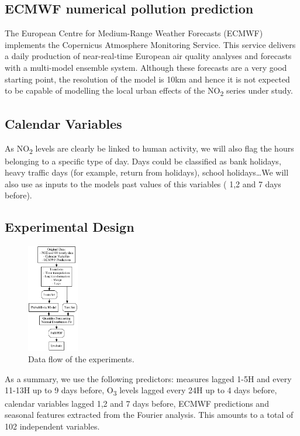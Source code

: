 \documentclass[a4paper,3p,sort&compress]{elsarticle}
\begin{document}
\subsection{ECMWF numerical pollution prediction}
\label{sec:ecmwf-numer-poll}

The European Centre for Medium-Range Weather Forecasts (ECMWF)
implements the Copernicus Atmosphere Monitoring Service.  This service
delivers a daily production of near-real-time European air quality
analyses and forecasts with a multi-model ensemble system. Although
these forecasts are a very good starting point, 
the resolution of the model is 10km
and hence it is not expected to be capable of modelling the local
urban effects of the NO\textsubscript{2} series under study.

\subsection{Calendar Variables}
\label{sec:cal_data}

As NO\textsubscript{2} levels are clearly be linked to human activity,
we will also flag the hours belonging to a specific type of day. Days
could be classified as bank holidays, heavy traffic days (for example,
return from holidays), school holidays\ldots We will also use as
inputs to the models past values of this variables ( 1,2 and 7 days
before).

\subsection{Experimental Design}
\label{sec:experimental-design}

\begin{figure}
  \centering
  \includegraphics[width=0.2\textwidth]{diagrams/flow}
  \caption{\label{figure:dataflow}Data flow of the
    experiments.}
\end{figure}

As a summary, we use the following predictors: \no
measures lagged 1-5H and every 11-13H up to 9 days before,
O\textsubscript{3} levels lagged every 24H up to 4 days before, 
calendar variables lagged 1,2 and 7 days before,
 ECMWF predictions and seasonal features extracted
from the Fourier analysis. This amounts to a total of 102 independent
variables. 
\end{document}
